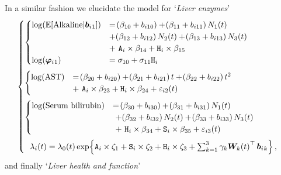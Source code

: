 In a similar fashion we elucidate the model for `\textit{Liver enzymes}'
\begin{equation}
    \begin{aligned}
    \begin{cases}
        \begin{cases}
           \log\lb\Exp\ls\mathrm{Alkaline}|\b{_1}\rs\rb&=\lb\beta_{10}+b_{i10}\rb + \lb\beta_{11} + b_{i11}\rb N_1(t) \\&+ \lb\beta_{12} + b_{i12}\rb N_2(t) + \lb\beta_{13} + b_{i13}\rb N_3(t) \\&+\ \tt{A}_i\times\beta_{14} + \tt{H}_i\times\beta_{15}\\ 
            \log\lb\bphi{_1}\rb&=\sigma_{10} + \sigma_{11}\tt{H}_i\\ 
        \end{cases}
        \\\noalign{\vspace*{2mm}}
        \begin{cases}
            \log\lb\mathrm{AST}\rb &= \lb\beta_{20} + b_{i20}\rb + \lb\beta_{21} + b_{i21}\rb t + \lb\beta_{22} + b_{i22}\rb t^2 \\&+\ \tt{A}_i\times\beta_{23} + \tt{H}_i\times\beta_{24} + \varepsilon_{i2}\lb t\rb
        \end{cases}
        \\\noalign{\vspace*{2mm}}
        \begin{cases}
            \log\lb\mathrm{Serum\ bilirubin}\rb &= \lb\beta_{30} + b_{i30}\rb + \lb\beta_{31} + b_{i31}\rb N_1(t) \\&\ + \lb\beta_{32} + b_{i32}\rb N_2(t) + \lb\beta_{33} + b_{i33}\rb N_3(t)\\&\ +\ \tt{H}_i\times\beta_{34} + \tt{S}_i\times\beta_{35} + \varepsilon_{i3}\lb t\rb
        \end{cases}
        \\\noalign{\vspace*{2mm}}
        \ \ \li\lb t\rb = \lo\lb t\rb \exp\lbr\tt{A}_i\times\zeta_1+\tt{S}_i\times\zeta_2+\tt{H}_i\times\zeta_3+\sum_{k=1}^3\gamma_k\bm{W}_k\lb t\rb^\top\b{_k}\rbr,
    \end{cases}       
    \end{aligned}
\label{eq:appendix-PBC-multivs-enzymes}
\end{equation}
and finally `\textit{Liver health and function}'
